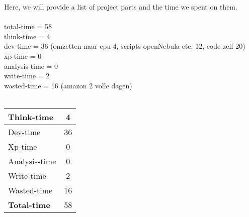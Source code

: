 Here, we will provide a list of project parts and the time we spent on them.\\\\
total-time = 58\\
think-time = 4\\
dev-time = 36 (omzetten naar cpu 4, scripts openNebula etc. 12, code zelf 20)\\
xp-time = 0\\
analysis-time = 0\\
write-time = 2\\
wasted-time = 16 (amazon 2 volle dagen)\\\\

\begin{tabular}{| l | c |}
\hline
Think-time & 4 \\
\hline
Dev-time & 36 \\
\hline
Xp-time & 0 \\
\hline
Analysis-time & 0 \\
\hline
Write-time & 2 \\
\hline
Wasted-time & 16 \\
\hline \hline
\textbf{Total-time} & 58 \\
\hline
\end{tabular}